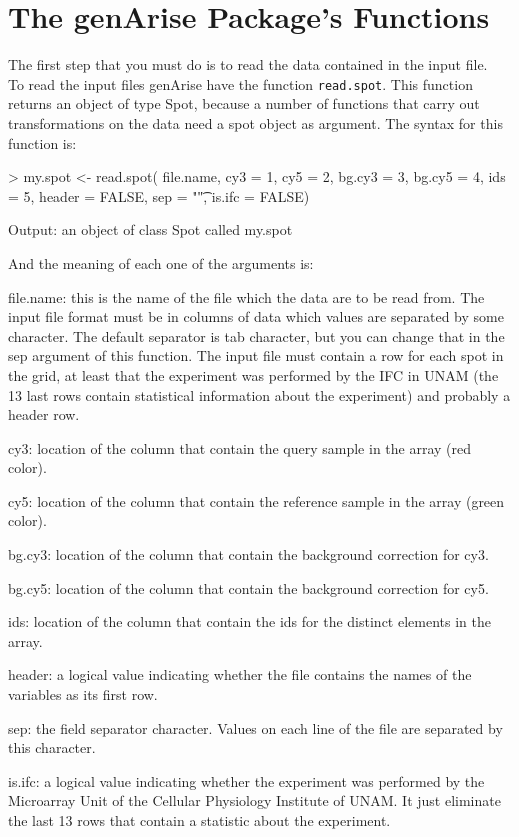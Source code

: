 \documentclass[12pt]{article}
\begin{document}
\section{The genArise Package's Functions}
The first step that you must do is to read the data contained in the input file.\\

To read the input files genArise have the function \texttt{read.spot}. This function returns an object of type Spot, because a number of functions that carry out transformations on the data need a spot object as argument. The syntax for this function is:

\begin{Scode}
> my.spot <- read.spot( file.name, cy3 = 1, cy5 = 2, 
  bg.cy3 = 3, bg.cy5 = 4, ids = 5, header = FALSE, 
  sep = "\t", is.ifc = FALSE)	
\end{Scode}

\begin{Soutput}
Output: an object of class Spot called my.spot
\end{Soutput}

And the meaning of each one of the arguments is:\\

\begin{description}
\item{file.name:} this is the name of the file which the data are to be read from.  The input file format must be in columns of data which values are separated by some character. The default separator is tab character, but you can change that in the sep argument of this function. The input file must contain a row for each spot in the grid, at least that the experiment was performed by the IFC in UNAM (the 13 last rows contain statistical information about the experiment) and probably a header row.
\item{cy3:} location of the column that contain the query sample in the array (red color).
\item{cy5:} location of the column that contain the reference sample in the array (green color).
\item{bg.cy3:} location of the column that contain the background correction for cy3.
\item{bg.cy5:} location of the column that contain the background correction for cy5.
\item{ids:} location of the column that contain the ids for the distinct elements in the array.
\item{header:} a logical value indicating whether the file contains the names of the variables as its first row.
\item{sep:} the field separator character.  Values on each line of the file are separated by this character.
\item{is.ifc:} a logical value indicating whether the experiment was performed by the Microarray Unit of the Cellular Physiology Institute of UNAM. It just eliminate the last 13 rows that contain a statistic about the experiment.
\end{description}
\end{document}
